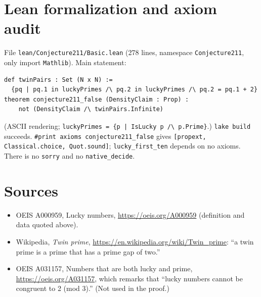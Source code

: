 \documentclass[11pt]{article}
\theoremstyle{definition}
\begin{document}
\section{Lean formalization and axiom audit}

File \texttt{lean/Conjecture211/Basic.lean} (278 lines, namespace \texttt{Conjecture211}, only
import \texttt{Mathlib}). Main statement:
\begin{verbatim}
def twinPairs : Set (N x N) :=
  {pq | pq.1 in luckyPrimes /\ pq.2 in luckyPrimes /\ pq.2 = pq.1 + 2}
theorem conjecture211_false (DensityClaim : Prop) :
    not (DensityClaim /\ twinPairs.Infinite)
\end{verbatim}
(ASCII rendering; \texttt{luckyPrimes = \{p | IsLucky p /\textbackslash{} p.Prime\}}.)
\texttt{lake build} succeeds. \texttt{\#print axioms conjecture211\_false} gives
\texttt{[propext, Classical.choice, Quot.sound]}; \texttt{lucky\_first\_ten} depends on no axioms.
There is no \texttt{sorry} and no \texttt{native\_decide}.

\section*{Sources}
\begin{itemize}
\item OEIS A000959, Lucky numbers, \url{https://oeis.org/A000959} (definition and data quoted
above).
\item Wikipedia, \emph{Twin prime}, \url{https://en.wikipedia.org/wiki/Twin_prime}: ``a twin prime
is a prime that has a prime gap of two.''
\item OEIS A031157, Numbers that are both lucky and prime, \url{https://oeis.org/A031157}, which
remarks that ``lucky numbers cannot be congruent to 2 (mod 3).'' (Not used in the proof.)
\end{itemize}
\end{document}
